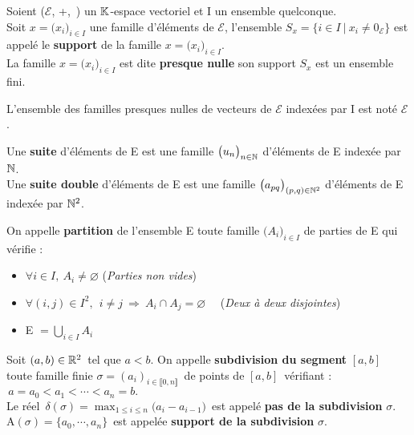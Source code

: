 Soient (\(\mathcal{E}\), +,\ \lce) un \(\mathbb{K}\)-espace vectoriel et I un ensemble quelconque.\\
Soit \(x=\bigl(x_i\bigr)_{i\in I}\) une famille d'éléments de \(\mathcal{E}\), l'ensemble \(S_x=\{i\in I \ | \ x_i \neq 0_{\mathcal{E}} \} \) est appelé le \textbf{support} de la famille \(x=\bigl(x_i\bigr)_{i\in I}\).\\
La famille \(x=\bigl(x_i\bigr)_{i\in I}\) est dite \textbf{presque nulle} \ssi son support \(S_x\) est un ensemble fini.\\
\begin{small}
    L'ensemble des familles presques nulles de vecteurs de $\mathcal{E}$ indexées par I est noté $\mathcal{E}$.
\end{small}

\vspace{1cm}

\noindent Une \textbf{suite} d'éléments de E est une famille \(\bigl(u_n\bigr)_{n\in \mathbb{N}}\) d'éléments de E indexée par \(\mathbb{N}\).\vspace{0.1cm} \\
Une \textbf{suite double} d'éléments de E est une famille \(\bigl(a_{pq}\bigr)_{(p,q)\in \mathbb{N} ^2}\) d'éléments de E indexée par \(\mathbb{N} ^2\).

\newpage

\noindent On appelle \textbf{partition} de l'ensemble E toute famille \(\bigl(A_i\bigr)_{i\in I}\) de parties de E qui vérifie :
\begin{itemize}[leftmargin=2cm, label=\lce]
    \item \(\forall i\in I,\ A_i \neq \varnothing \) \hspace{3.9cm} (\emph{Parties non vides})

    \item \(\forall (i,j)\in I^2,\ \ i\neq j\ \Rightarrow \ A_i \cap A_j = \varnothing \) \ \ (\emph{Deux à deux disjointes})

    \item E  \(=\displaystyle \bigcup _{i\in I} A_i \)
\end{itemize}

\vspace{1cm}

Soit \((a,b)\in\mathbb{R}^2\,\) tel que $a<b$. On appelle \textbf{subdivision du segment} $[a,b]\,$ toute famille finie \(\sigma=(a_i)_{i\in \llbracket 0,n \rrbracket}\,\) de points de $[a,b]\,$ vérifiant : \(\, a=a_0<a_1<\cdots<a_n=b.\)\vspace{0.2cm}\\
Le réel \(\, \displaystyle \delta( \sigma )=\max_{1\leq i \leq n}\bigl(a_i-a_{i-1}\bigr)\, \) est appelé \textbf{pas de la subdivision} $\sigma$.\vspace{0.2cm}\\
A\((\sigma)=\{a_0,\cdots,a_n\}\,\) est appelée \textbf{support de la subdivision} $\sigma$.


